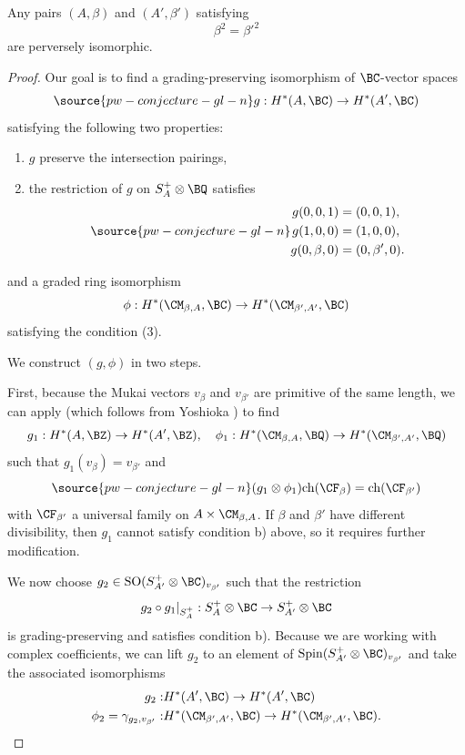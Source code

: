 \begin{thm}
\notready\label{thm2.6}
Any pairs $(A, \beta)$ and $(A', \beta')$ satisfying
\[
\beta^2 = \beta'^2
\]
are perversely isomorphic.
\end{thm}

\begin{proof}

Our goal is to find a grading-preserving isomorphism of $\BC$-vector spaces
\begin{equation}\label{39}
\source{pw-conjecture-gl-n}
g: H^*(A, \BC)  \to H^*(A', \BC)
\end{equation}
satisfying the following two properties:
\begin{enumerate}
    \item[(a)] $g$ preserve the intersection pairings,
    \item[(b)] the restriction of $g$ on $S_A^+\otimes \BQ$ satisfies
    \begin{equation}\label{40}
\source{pw-conjecture-gl-n}
    \begin{split}
        g(0,0,1) & = (0,0,1),\\
        g(1,0,0) & = (1,0,0),\\
        g(0,\beta,0) & = (0, \beta',0).
    \end{split}
    \end{equation}
\end{enumerate}
and a graded ring isomorphism
 \[
 \phi : H^*(\CM_{\beta,A}, \BC) \to H^*(\CM_{\beta', A'}, \BC)
 \]
satisfying the condition (3).

We construct $(g, \phi)$ in two steps.

First, because the Mukai vectors $v_\beta$ and $v_{\beta'}$ are primitive of the same length,
we can apply \cite[Theorem 8.3]{Markman3} (which follows from Yoshioka \cite{Yo}) to find
\[ g_1: H^*(A, \BZ)  \to H^*(A', \BZ) ,\quad \phi_1: H^*(\CM_{\beta,A}, \BQ) \to H^*(\CM_{\beta', A'}, \BQ)\]
such that $g_1(v_\beta) = v_{\beta'}$ and
\begin{equation}\label{eq41}
\source{pw-conjecture-gl-n}
(g_1 \otimes \phi_1) \mathrm{ch}(\CF_\beta) = \mathrm{ch}(\CF_{\beta'})
\end{equation}
with $\CF_{\beta'}$ a universal family on $A \times \CM_{\beta,A}$.
If $\beta$ and $\beta'$ have different divisibility, then $g_1$ cannot satisfy condition b) above, so it requires further modification.

We now choose $g_2 \in \mathrm{SO}(S_{A'}^+\otimes \BC)_{v_{\beta'}}$ such that the restriction
$$g_2\circ g_1|_{S_{A}^{+}}: S_{A}^{+} \otimes \BC \rightarrow S_{A'}^{+}\otimes\BC$$
is grading-preserving and satisfies condition b).
Because we are working with complex coefficients, we can lift $g_2$ to an element of
$\mathrm{Spin}(S_{A'}^{+}\otimes \BC)_{v_{\beta'}}$ and take the associated isomorphisms
\[
\begin{split}
 g_2: &  H^*(A',\BC)  \rightarrow H^*(A',\BC)
\\
\phi_2=  \gamma_{g_2,v_{\beta'}}: &   H^*(\CM_{\beta',A'},\BC)  \rightarrow H^*(\CM_{\beta',A'},\BC).
\end{split}
\]


\end{proof}
